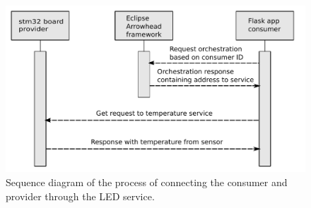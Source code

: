\begin{figure}[h!]
    \centering
    \includegraphics[width=\textwidth]{Pictures/sequence_diagram_consumer.pdf} 
    \caption{Sequence diagram of the process of connecting the consumer and provider through the LED service.}
    \label{sequence diagram consumer}
\end{figure}

